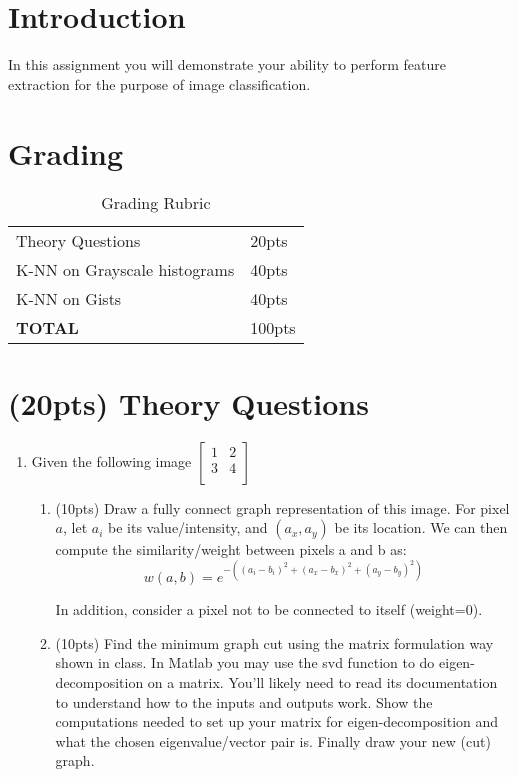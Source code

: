 \documentclass[12pt]{article}
\begin{document}
\maketitle


\section*{Introduction}
In this assignment you will demonstrate your ability to perform feature extraction for the purpose of image classification.


\section*{Grading}
\begin{table}[h]
\begin{centering}
\begin{tabular}{|l|l|}
\hline
Theory Questions & 20pts \\
K-NN on Grayscale histograms & 40pts\\
K-NN on Gists & 40pts \\
\hline
\textbf{TOTAL} & 100pts\\
\hline
\end{tabular}
\caption{Grading Rubric}
\end{centering}
\end{table}

\newpage
\section{(20pts) Theory Questions}
\begin{enumerate}
\item Given the following image
	$\begin{bmatrix}
	1 & 2\\
	3 & 4\\
	\end{bmatrix}$
\begin{enumerate}
\item (10pts) Draw a fully connect graph representation of this image.  For pixel $a$, let $a_i$ be its value/intensity, and $(a_x,a_y )$ be its location.  We can then compute the similarity/weight between pixels a and b as:
$$w(a,b)=e^{-((a_i-b_i )^2+(a_x-b_x )^2+(a_y-b_y )^2 ) }$$
	
In addition, consider a pixel not to be connected to itself (weight=0).

\item (10pts) Find the minimum graph cut using the matrix formulation way shown in class.  In Matlab you may use the svd function to do eigen-decomposition on a matrix.  You’ll likely need to read its documentation to understand how to the inputs and outputs work.  Show the computations needed to set up your matrix for eigen-decomposition and what the chosen eigenvalue/vector pair is.  Finally draw your new (cut) graph.
\end{enumerate}
\end{enumerate}
\end{document}
